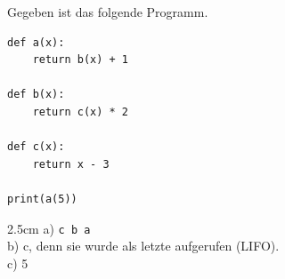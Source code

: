 \question[3]
Gegeben ist das folgende Programm.
\begin{lstlisting}
def a(x):
    return b(x) + 1

def b(x):
    return c(x) * 2

def c(x):
    return x - 3

print(a(5))
\end{lstlisting}
\begin{solutionbox}{2.5cm}
a) \texttt{c b a} \\
b) c, denn sie wurde als letzte aufgerufen (LIFO). \\
c) 5
\end{solutionbox}
